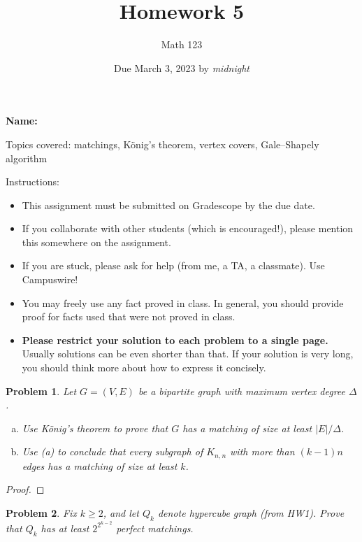 \documentclass[11pt]{article}
\author{Math 123}
\date{Due March 3, 2023 by \emph{midnight} }
\title{Homework 5}
\newtheorem{problem}{Problem}
\begin{document}
\maketitle

{\bf\Large Name:} 


\vspace{.3in}
Topics covered: matchings, K\"onig's theorem, vertex covers, Gale--Shapely algorithm 

Instructions: 
\begin{itemize}
\item This assignment must be submitted on Gradescope by the due date. 
\item If you collaborate with other students (which is encouraged!), please mention this somewhere on the assignment. 
\item If you are stuck, please ask for help (from me, a TA, a classmate). Use Campuswire!  
\item You may freely use any fact proved in class. In general, you should provide proof for facts used that were not proved in class. 
\item {\bf Please restrict your solution to each problem to a single page.} Usually solutions can be even shorter than that. If your solution is very long, you should think more about how to express it concisely.
\end{itemize}

\pagebreak 



\begin{problem}
Let $G=(V,E)$ be a bipartite graph with maximum vertex degree $\Delta$. \begin{enumerate}[(a)]
\item Use K\"onig's theorem to prove that $G$ has a matching of size at least $|E|/\Delta$. 
\item Use (a) to conclude that every subgraph of $K_{n,n}$ with more than $(k-1)n$ edges has a matching of size at least $k$. 
\end{enumerate} 
\end{problem}

\begin{proof}

\end{proof}

\pagebreak



\begin{problem}
Fix $k\ge2$, and let $Q_k$ denote hypercube graph (from HW1). Prove that $Q_k$ has at least $2^{2^{k-2}}$ perfect matchings.
\end{problem}
\end{document}
